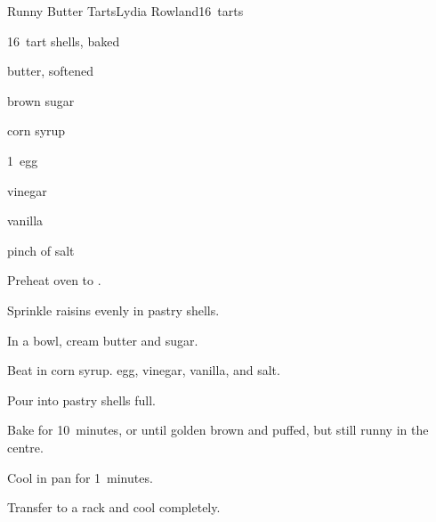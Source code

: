 \begin{recipe}{Runny Butter Tarts}{Lydia Rowland}{16~tarts}

\begin{ingredients}
\item 16~tart shells, baked
\item \C{\quarter} 
\item \C{\quarter} butter, softened
\item \C{\half} brown sugar
\item \C{\half} corn syrup
\item 1~egg
\item {} vinegar
\item {} vanilla
\item pinch of salt
\end{ingredients}

\begin{directions}
\item Preheat oven to .
\item Sprinkle raisins evenly in pastry shells.
\item In a bowl, cream butter and sugar.
\item Beat in corn syrup. egg, vinegar, vanilla, and salt.
\item Pour into pastry shells \threequarter{} full.
\item Bake for 10~minutes, or until golden brown and puffed, but still runny in the centre.
\item Cool in pan for 1~minutes.
\item Transfer to a rack and cool completely.
\end{directions}

\end{recipe}
